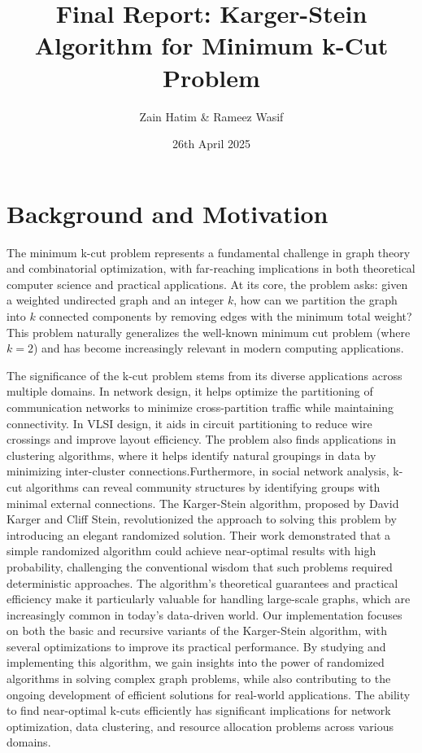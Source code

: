 \documentclass[11pt]{article}
\title{Final Report: Karger-Stein Algorithm for Minimum k-Cut Problem}
\author{Zain Hatim & Rameez Wasif}
\date{26th April 2025}
\begin{document}
\maketitle

\section{Background and Motivation}

The minimum k-cut problem represents a fundamental challenge in graph theory and combinatorial optimization, with far-reaching implications in both theoretical computer science and practical applications. At its core, the problem asks: given a weighted undirected graph and an integer \( k \), how can we partition the graph into \( k \) connected components by removing edges with the minimum total weight? This problem naturally generalizes the well-known minimum cut problem (where \( k=2 \)) and has become increasingly relevant in modern computing applications. \newline

The significance of the k-cut problem stems from its diverse applications across multiple domains. In network design, it helps optimize the partitioning of communication networks to minimize cross-partition traffic while maintaining connectivity. In VLSI design, it aids in circuit partitioning to reduce wire crossings and improve layout efficiency. The problem also finds applications in clustering algorithms, where it helps identify natural groupings in data by minimizing inter-cluster connections.\newline \newline Furthermore, in social network analysis, k-cut algorithms can reveal community structures by identifying groups with minimal external connections.
\newline \newline
The Karger-Stein algorithm, proposed by David Karger and Cliff Stein, revolutionized the approach to solving this problem by introducing an elegant randomized solution. Their work demonstrated that a simple randomized algorithm could achieve near-optimal results with high probability, challenging the conventional wisdom that such problems required deterministic approaches. The algorithm's theoretical guarantees and practical efficiency make it particularly valuable for handling large-scale graphs, which are increasingly common in today's data-driven world.
\newline \newline
Our implementation focuses on both the basic and recursive variants of the Karger-Stein algorithm, with several optimizations to improve its practical performance. By studying and implementing this algorithm, we gain insights into the power of randomized algorithms in solving complex graph problems, while also contributing to the ongoing development of efficient solutions for real-world applications. The ability to find near-optimal k-cuts efficiently has significant implications for network optimization, data clustering, and resource allocation problems across various domains.
\end{document}

